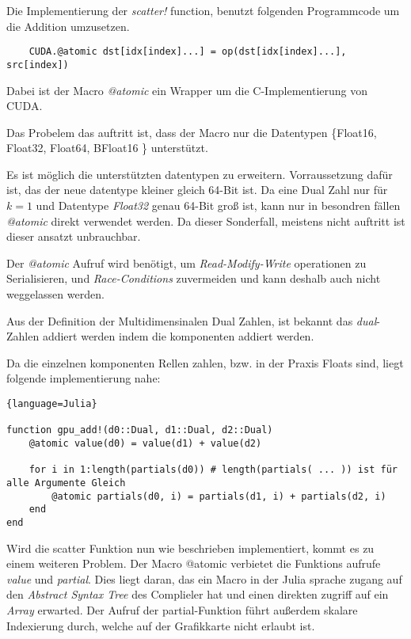 Die Implementierung der \textit{scatter!} function, benutzt folgenden Programmcode um die 
Addition umzusetzen. 

\begin{lstlisting}
	CUDA.@atomic dst[idx[index]...] = op(dst[idx[index]...], src[index])
\end{lstlisting}


Dabei ist der Macro \textit{@atomic} ein Wrapper um die C-Implementierung von CUDA.

Das Probelem das auftritt ist, dass der Macro nur die Datentypen \{Float16, Float32, Float64, BFloat16 \}
unterstützt.

Es ist möglich die unterstützten datentypen zu erweitern. 
Vorraussetzung dafür ist, das der neue datentype kleiner gleich 64-Bit ist.
Da eine Dual Zahl nur für $k = 1$ und Datentype \textit{Float32} genau 64-Bit groß ist,
kann nur in besondren fällen \textit{@atomic} direkt verwendet werden.
Da dieser Sonderfall, meistens nicht auftritt ist dieser ansatzt unbrauchbar.

Der \textit{@atomic} Aufruf wird benötigt, 
um \textit{Read-Modify-Write} operationen zu Serialisieren, 
und \textit{Race-Conditions} zuvermeiden und kann deshalb auch nicht weggelassen werden.

Aus der Definition der Multidimensinalen Dual Zahlen, ist bekannt das \textit{dual}-Zahlen addiert werden 
indem die komponenten addiert werden.

Da die einzelnen komponenten Rellen zahlen, 
bzw. in der Praxis Floats sind, liegt folgende implementierung nahe:

\begin{lstlisting}{language=Julia}

function gpu_add!(d0::Dual, d1::Dual, d2::Dual)
	@atomic value(d0) = value(d1) + value(d2)
	
	for i in 1:length(partials(d0)) # length(partials( ... )) ist für alle Argumente Gleich
		@atomic partials(d0, i) = partials(d1, i) + partials(d2, i)
	end
end

\end{lstlisting}

Wird die scatter Funktion nun wie beschrieben implementiert, kommt es zu einem weiteren Problem.
Der Macro @atomic verbietet die Funktions aufrufe \textit{value} und \textit{partial}.
Dies liegt daran, das ein Macro in der Julia sprache zugang auf den \textit{Abstract Syntax Tree} des Complieler hat
und einen direkten zugriff auf ein \textit{Array} erwarted.
Der Aufruf der partial-Funktion führt außerdem skalare Indexierung durch, welche auf der Grafikkarte nicht erlaubt ist.



